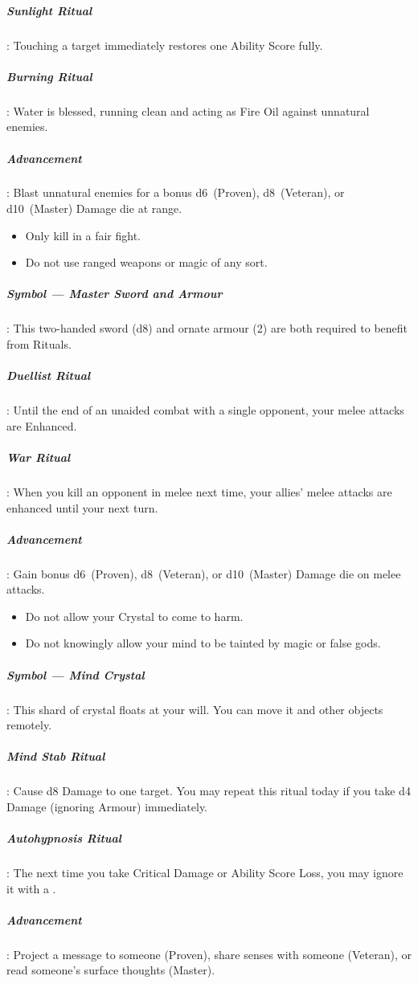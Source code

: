 \documentclass[itdr]{subfiles}
\begin{document}
\subparagraph{Sunlight Ritual}: Touching a target immediately restores one Ability Score fully.

\subparagraph{Burning Ritual}: Water is blessed, running clean and acting as Fire Oil against unnatural enemies.

\subparagraph{Advancement}: Blast unnatural enemies for a bonus d6~(Proven), d8~(Veteran), or d10~(Master) Damage die at range.

\vfill
\break
{}

{\em\begin{itemize}
		\item Only kill in a fair fight.
		\item Do not use ranged weapons or magic of any sort.
\end{itemize}}

\subparagraph{Symbol --- Master Sword and Armour}: This two-handed sword (d8) and ornate armour (2) are both required to benefit from Rituals.

\subparagraph{Duellist Ritual}: Until the end of an unaided combat with a single opponent, your melee attacks are Enhanced.

\subparagraph{War Ritual}: When you kill an opponent in melee next time, your allies' melee attacks are enhanced until your next turn.

\subparagraph{Advancement}: Gain bonus d6~(Proven), d8~(Veteran), or d10~(Master) Damage die on melee attacks.

\vspace{1em}

{\em\begin{itemize}
		\item Do not allow your Crystal to come to harm.
		\item Do not knowingly allow your mind to be tainted by magic or false gods.
\end{itemize}}

\subparagraph{Symbol --- Mind Crystal}: This shard of crystal floats at your will. You can move it and other objects remotely.

\subparagraph{Mind Stab Ritual}: Cause d8 Damage to one target. You may repeat this ritual today if you take d4 Damage (ignoring Armour) immediately.

\subparagraph{Autohypnosis Ritual}: The next time you take Critical Damage or Ability Score Loss, you may ignore it with a .

\subparagraph{Advancement}: Project a message to someone (Proven), share senses with someone (Veteran), or read someone's surface thoughts (Master).
\end{document}
